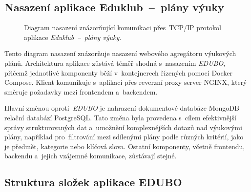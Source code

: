 \documentclass[male,czech,api_bc]{kitheses}
\begin{document}
\subsection{Nasazení aplikace Eduklub~--~plány výuky}

\begin{figure}[H]
	\centering
	\caption{Diagram nasazení znázorňující komunikaci přes~TCP/IP protokol aplikace \textit{Eduklub~--~plány výuky}.}
	\label{fig:deployment-diagram-2}
\end{figure}


Tento diagram nasazení znázorňuje nasazení webového agregátoru výukových plánů. Architektura aplikace zůstává téměř shodná s~nasazením \textit{EDUBO}, přičemž jednotlivé komponenty běží v~kontejnerech řízených pomocí Docker Compose. Klient komunikuje s~aplikací přes reverzní proxy server NGINX, který směruje požadavky mezi frontendem a~backendem.

Hlavní změnou oproti~\textit{EDUBO} je nahrazení dokumentové databáze MongoDB relační databází PostgreSQL. Tato změna byla provedena s~cílem efektivnější správy strukturovaných dat a~umožnění komplexnějších dotazů nad výukovými plány, například pro~filtrování mezi sdílenými plány podle různých kritérií, jako je předmět, kategorie nebo klíčová slova. Ostatní komponenty, včetně frontendu, backendu a~jejich vzájemné komunikace, zůstávají stejné.

\subsection{Struktura složek aplikace EDUBO}
\end{document}
